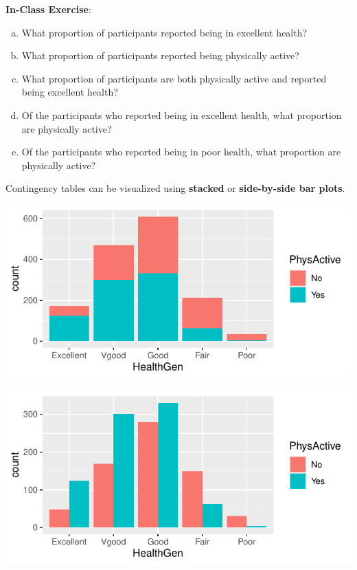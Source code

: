 \documentclass[11pt]{article}\usepackage[]{graphicx}\usepackage[]{color}
\makeatletter
\def\maxwidth{ %
  \ifdim\Gin@nat@width>\linewidth
    \linewidth
  \else
    \Gin@nat@width
  \fi
}
\newenvironment{knitrout}{}{} %
\makeatother
\begin{document}
\textbf{In-Class Exercise}:
\begin{enumerate}[(a)]
\item What proportion of participants reported being in excellent health?
\vspace{1cm}
\item What proportion of participants reported being physically active?
\vspace{1cm}
\item What proportion of participants are both physically active and reported being excellent health?
\vspace{1cm}
\item Of the participants who reported being in excellent health, what proportion are physically active?
\vspace{1cm}
\item  Of the participants who reported being in poor health, what proportion are physically active?
\end{enumerate}

\newpage

Contingency tables can be visualized using \textbf{stacked} or \textbf{side-by-side bar plots}.
\vspace{5pt}

\begin{knitrout}
\color{fgcolor}
\includegraphics[width=\maxwidth]{figure/unnamed-chunk-3-1} 

\end{knitrout}
\vspace{10pt}

\begin{knitrout}
\color{fgcolor}
\includegraphics[width=\maxwidth]{figure/unnamed-chunk-4-1} 

\end{knitrout}
\vspace{10pt}
\end{document}

